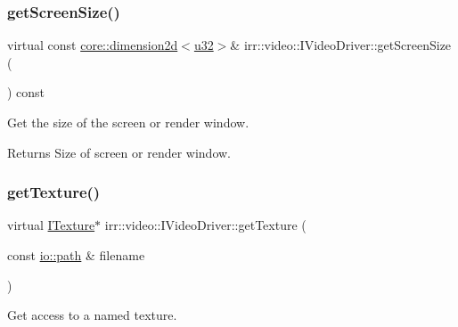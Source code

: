 \subsubsection{\texorpdfstring{get\+Screen\+Size()}{getScreenSize()}}
{\footnotesize\ttfamily virtual const \hyperlink{classirr_1_1core_1_1dimension2d}{core\+::dimension2d}$<$\hyperlink{namespaceirr_a0416a53257075833e7002efd0a18e804}{u32}$>$\& irr\+::video\+::\+I\+Video\+Driver\+::get\+Screen\+Size (\begin{DoxyParamCaption}{ }\end{DoxyParamCaption}) const\hspace{0.3cm}{\ttfamily [pure virtual]}}



Get the size of the screen or render window. 

\begin{DoxyReturn}{Returns}
Size of screen or render window. 
\end{DoxyReturn}
\mbox{\label{classirr_1_1video_1_1IVideoDriver_af4055165190e4adf221c6dc6f2434ea0}} 
\subsubsection{\texorpdfstring{get\+Texture()}{getTexture()}\hspace{0.1cm}{\footnotesize\ttfamily [1/2]}}
{\footnotesize\ttfamily virtual \hyperlink{classirr_1_1video_1_1ITexture}{I\+Texture}$\ast$ irr\+::video\+::\+I\+Video\+Driver\+::get\+Texture (\begin{DoxyParamCaption}\item[{const \hyperlink{namespaceirr_1_1io_ab1bdc45edb3f94d8319c02bc0f840ee1}{io\+::path} \&}]{filename }\end{DoxyParamCaption})\hspace{0.3cm}{\ttfamily [pure virtual]}}



Get access to a named texture. 

